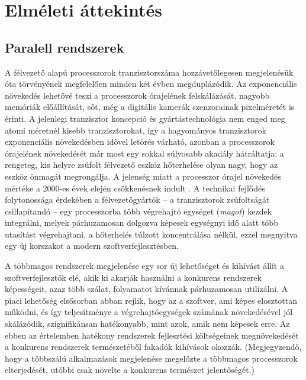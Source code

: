 \chapter{Elméleti áttekintés}

\section{Paralell rendszerek}

A félvezető alapú processzorok tranzisztorszáma hozzávetőlegesen megjelenésük óta \cite{Moore} törvényének megfelelően minden két évben megduplázódik. Az exponenciális növekedés lehetővé teszi a processzorok órajelének felskálázását, nagyobb memóriák előállítását, sőt, még a digitális kamerák szenzorainak pixelméretét is érinti. A jelenlegi tranzisztor koncepció és gyártástechnológia nem enged meg atomi méretnél kisebb tranzisztorokat, így a hagyományos tranzisztorok exponenciális növekedésben idővel letörés várható, azonban a processzorok órajelének növekedését már most egy sokkal súlyosabb akadály hátráltatja: a rengeteg, kis helyre zsúfolt félvezető eszköz hőterhelése olyan nagy, hogy az eszköz önmagát megrongálja. A jelenség miatt a processzor órajel növekedés mértéke a 2000-es évek elején csökkenésnek indult \cite{CMOS-VLSI}. A technikai fejlődés folytonossága érdekében a félvezetőgyártók -- a tranzisztorok zsúfoltságát csillapítandó -- egy processzorba több végrehajtó egységet (\emph{magot}) kezdek integrálni, melyek párhuzamosan dolgozva képesek egységnyi idő alatt több utasítást végrehajtani, a hőterhelés túlzott koncentrálása nélkül, ezzel megnyitva egy új korszakot a modern szoftverfejlesztésben.

    A többmagos rendszerek megjelenése egy sor új lehetőséget és kihívást állít a szoftverfejlesztők elé, akik ki akarják használni a konkurens rendszerek képességeit, azaz több szálat, folyamatot kívánnak párhuzamosan utilizálni. A piaci lehetőség elsősorban abban rejlik, hogy az a szoftver, ami képes elosztottan működni, és így teljesítménye a végrehajtóegységek számának növekedésével jól skálázódik, szignifikánsan hatékonyabb, mint azok, amik nem képesek erre. Az ebben az értelemben hatékony rendszerek fejlesztési költségeinek megnövekedését a konkurens rendszerek természetéből fakadók kihívások okozzák. (Megjegyzendő, hogy a többszálú alkalmazások megjelenése megelőzte a többmagos processzorok elterjedését, utóbbi csak növelte a konkurens természet jelentőségét.)
    
